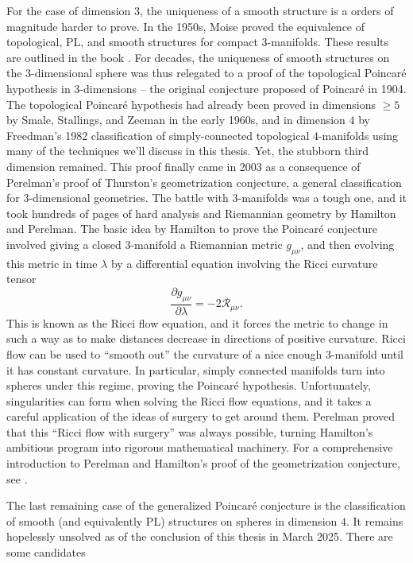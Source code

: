 For the case of dimension $3$, the uniqueness of a smooth structure is a orders of magnitude harder to prove. In the 1950s, Moise proved the equivalence of topological, PL, and smooth structures for compact $3$-manifolds. These results are outlined in the book \cite{moise1977geometric}. For decades, the uniqueness of smooth structures on the 3-dimensional sphere was thus relegated to a proof of the topological Poincar\'e hypothesis in 3-dimensions -- the original conjecture proposed of Poincar\'e in 1904. The topological Poincar\'e hypothesis had already been proved in dimensions $\geq 5$ by Smale, Stallings, and Zeeman in the early 1960s, and in dimension $4$ by Freedman's 1982 classification \cite{freedman1982manifold} of simply-connected topological $4$-manifolds using many of the techniques we'll discuss in this thesis. Yet, the stubborn third dimension remained.
This proof finally came in 2003 as a consequence of Perelman's proof of Thurston's geometrization conjecture, a general classification for 3-dimensional geometries.
The battle with $3$-manifolds was a tough one, and it took hundreds of pages of hard analysis and Riemannian geometry by Hamilton and Perelman.
The basic idea by Hamilton to prove the Poincar\'e conjecture involved giving a
closed $3$-manifold a Riemannian metric $g_{\mu\nu}$, and then evolving this metric in time $\lambda$ by a differential equation involving the Ricci curvature tensor
\begin{equation}
	\frac{\partial g_{\mu\nu}}{\partial \lambda} = -2\mathcal{R}_{\mu\nu}.
\end{equation}
This is known as the Ricci flow equation, and it forces the metric to change in such a way as to make distances decrease in directions of positive curvature.
Ricci flow can be used to ``smooth out'' the curvature of a nice enough $3$-manifold until it has constant curvature. In particular, simply connected manifolds turn into spheres under this regime, proving the Poincar\'e hypothesis.
Unfortunately, singularities can form when solving the Ricci flow equations, and it takes a careful application of the ideas of surgery to get around them. Perelman proved that this ``Ricci flow with surgery'' was always possible, turning Hamilton's ambitious program into rigorous mathematical machinery. For a comprehensive introduction to Perelman and Hamilton's proof of the geometrization conjecture, see \cite{morgantian2007ricci}.

The last remaining case of the generalized Poincar\'e conjecture is the classification of smooth (and equivalently PL) structures on spheres in dimension $4$. It remains hopelessly unsolved as of the conclusion of this thesis in March 2025. There are some candidates

